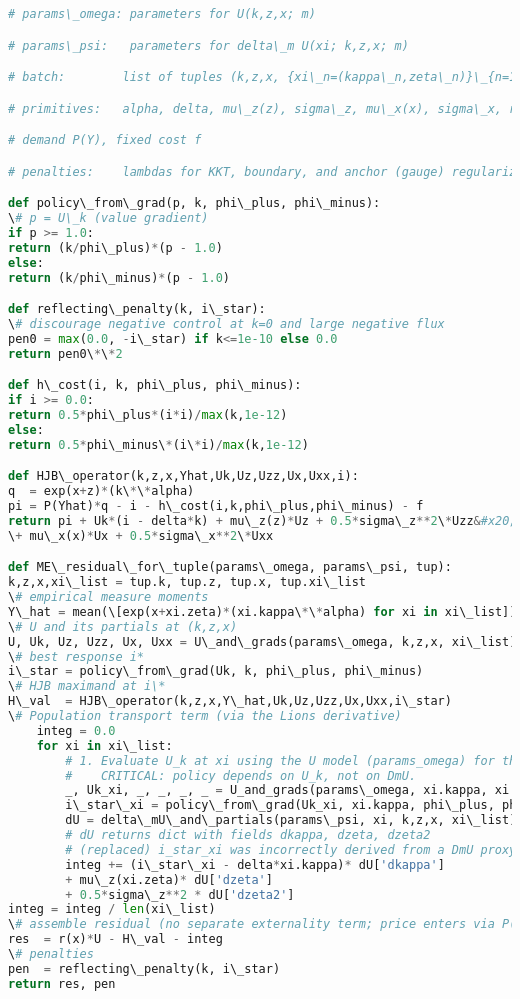 ﻿\documentclass[11pt,letterpaper,oneside]{article}
\numberwithin{equation}{section}
\newcommand{\1}{\mathbf{1}}
\begin{document}
\begin{tcolorbox}[didacticstyle]
\begin{itemize}[leftmargin=1.1em,itemsep=0.25em]
\begin{lstlisting}[language=Python,caption={Pseudo-JAX for (ME) residual with empirical measure}]
# params\_omega: parameters for U(k,z,x; m)

# params\_psi:   parameters for delta\_m U(xi; k,z,x; m)

# batch:        list of tuples (k,z,x, {xi\_n=(kappa\_n,zeta\_n)}\_{n=1}^N )

# primitives:   alpha, delta, mu\_z(z), sigma\_z, mu\_x(x), sigma\_x, r(x),

# demand P(Y), fixed cost f

# penalties:    lambdas for KKT, boundary, and anchor (gauge) regularizers

def policy\_from\_grad(p, k, phi\_plus, phi\_minus):
\# p = U\_k (value gradient)
if p >= 1.0:
return (k/phi\_plus)*(p - 1.0)
else:
return (k/phi\_minus)*(p - 1.0)

def reflecting\_penalty(k, i\_star):
\# discourage negative control at k=0 and large negative flux
pen0 = max(0.0, -i\_star) if k<=1e-10 else 0.0
return pen0\*\*2

def h\_cost(i, k, phi\_plus, phi\_minus):
if i >= 0.0:
return 0.5*phi\_plus*(i*i)/max(k,1e-12)
else:
return 0.5*phi\_minus\*(i\*i)/max(k,1e-12)

def HJB\_operator(k,z,x,Yhat,Uk,Uz,Uzz,Ux,Uxx,i):
q  = exp(x+z)*(k\*\*alpha)
pi = P(Yhat)*q - i - h\_cost(i,k,phi\_plus,phi\_minus) - f
return pi + Uk*(i - delta*k) + mu\_z(z)*Uz + 0.5*sigma\_z**2\*Uzz&#x20;
\+ mu\_x(x)*Ux + 0.5*sigma\_x**2\*Uxx

def ME\_residual\_for\_tuple(params\_omega, params\_psi, tup):
k,z,x,xi\_list = tup.k, tup.z, tup.x, tup.xi\_list
\# empirical measure moments
Y\_hat = mean(\[exp(x+xi.zeta)*(xi.kappa\*\*alpha) for xi in xi\_list])
\# U and its partials at (k,z,x)
U, Uk, Uz, Uzz, Ux, Uxx = U\_and\_grads(params\_omega, k,z,x, xi\_list)
\# best response i*
i\_star = policy\_from\_grad(Uk, k, phi\_plus, phi\_minus)
\# HJB maximand at i\*
H\_val  = HJB\_operator(k,z,x,Y\_hat,Uk,Uz,Uzz,Ux,Uxx,i\_star)
\# Population transport term (via the Lions derivative)
    integ = 0.0
    for xi in xi\_list:
        # 1. Evaluate U_k at xi using the U model (params_omega) for the policy i*(xi).
        #    CRITICAL: policy depends on U_k, not on DmU.
        _, Uk_xi, _, _, _, _ = U_and_grads(params\_omega, xi.kappa, xi.zeta, x, xi\_list)
        i\_star\_xi = policy\_from\_grad(Uk_xi, xi.kappa, phi\_plus, phi\_minus)
        dU = delta\_mU\_and\_partials(params\_psi, xi, k,z,x, xi\_list)
        # dU returns dict with fields dkappa, dzeta, dzeta2
        # (replaced) i_star_xi was incorrectly derived from a DmU proxy gradient.
        integ += (i\_star\_xi - delta*xi.kappa)* dU['dkappa'] 
        + mu\_z(xi.zeta)* dU['dzeta'] 
        + 0.5*sigma\_z**2 * dU['dzeta2']
integ = integ / len(xi\_list)
\# assemble residual (no separate externality term; price enters via P(Yhat) in HJB)
res  = r(x)*U - H\_val - integ
\# penalties
pen  = reflecting\_penalty(k, i\_star)
return res, pen


\end{lstlisting}
\end{itemize}
\end{tcolorbox}
\end{document}
